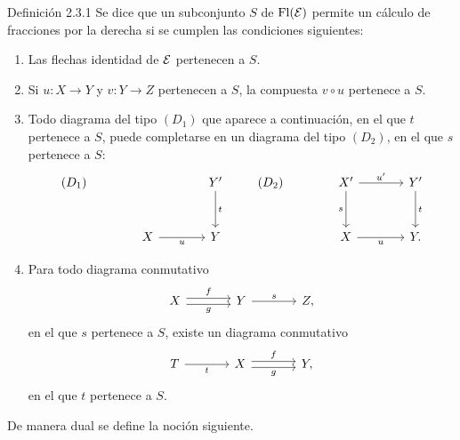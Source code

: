 \begin{statement}{Definición 2.3.1}
Se dice que un subconjunto $S$ de $\operatorname{Fl}(\mathcal E)$ permite un cálculo de fracciones por la derecha si se cumplen las condiciones siguientes:
\begin{enumerate}[label=(\alph*)]
\item Las flechas identidad de $\mathcal E$ pertenecen a $S$.
\item Si $u:X\to Y$ y $v:Y\to Z$ pertenecen a $S$, la compuesta $v\circ u$ pertenece a $S$.
\item Todo diagrama del tipo $(D_1)$ que aparece a continuación, en el que $t$ pertenece a $S$, puede completarse en un diagrama del tipo $(D_2)$, en el que $s$ pertenece a $S$:
\[
\begin{tikzcd}[column sep=large,row sep=large]
(D_1)& & Y' \arrow[d,"t"]\\
& X \arrow[r,"u"'] & Y
\end{tikzcd}
\qquad
\begin{tikzcd}[column sep=large,row sep=large]
(D_2)& X' \arrow[r,"u'"] \arrow[d,"s"'] & Y' \arrow[d,"t"]\\
& X \arrow[r,"u"'] & Y .
\end{tikzcd}
\]
\item Para todo diagrama conmutativo
\[
\begin{tikzcd}[column sep=large]
X \arrow[r,shift left,"f"] \arrow[r,shift right,"g"'] & Y \arrow[r,"s"] & Z,
\end{tikzcd}
\]
en el que $s$ pertenece a $S$, existe un diagrama conmutativo
\[
\begin{tikzcd}[column sep=large]
T \arrow[r,"t"'] & X \arrow[r,shift left,"f"] \arrow[r,shift right,"g"'] & Y,
\end{tikzcd}
\]
en el que $t$ pertenece a $S$.
\end{enumerate}
\end{statement}

De manera dual se define la noción siguiente.

